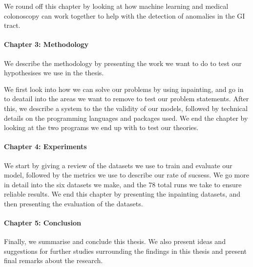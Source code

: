 We round off this chapter by looking at how machine learning and medical colonoscopy can work together to help with the detection of anomalies in the GI tract.

\paragraph{Chapter 3: Methodology }
We describe the methodology by presenting the work we want to do to test our hypothesises we use in the thesis.

We first look into how we can solve our problems by using inpainting, and go in to deatail into the areas we want to remove to test our problem statements. 
After this, we describe a system to the the validity of our models, followed by technical details on the programming languages and packages used.
We end the chapter by looking at the two programs we end up with to test our theories. 


\paragraph{Chapter 4: Experiments}
We start by giving a review of the datasets we use to train and evaluate our model, followed by the metrics we use to describe our rate of sucsess.
We go more in detail into the six datasets we make, and the 78 total runs we take to ensure reliable results.
We end this chapter by presenting the inpainting datasets, and then presenting the evaluation of the datasets.


\paragraph{Chapter 5: Conclusion}
Finally, we summarise and conclude this thesis.
We also present ideas and suggestions for further studies surrounding
the findings in this thesis and present final remarks about the research.

